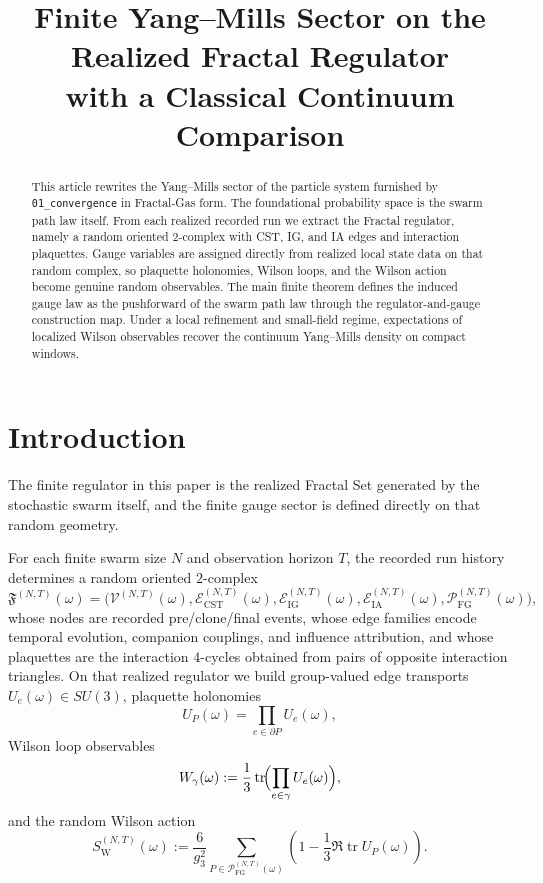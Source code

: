 \documentclass[11pt]{article}
\title{Finite Yang--Mills Sector on the Realized Fractal Regulator\\
with a Classical Continuum Comparison}
\author{}
\date{}
\theoremstyle{definition}
\theoremstyle{remark}
\newcommand{\mcE}{\mathcal E}
\newcommand{\mcP}{\mathcal P}
\newcommand{\mcV}{\mathcal V}
\newcommand{\tr}{\operatorname{tr}}
\begin{document}
\maketitle

\begin{abstract}
This article rewrites the Yang--Mills sector of the particle system furnished
by \texttt{01\_convergence} in Fractal-Gas form. The foundational probability
space is the swarm path law itself. From each realized recorded run we extract
the Fractal regulator, namely a random oriented \(2\)-complex with CST, IG,
and IA edges and interaction plaquettes. Gauge variables are assigned directly
from realized local state data on that random complex, so plaquette holonomies,
Wilson loops, and the Wilson action become genuine random observables. The main
finite theorem defines the induced gauge law as the pushforward of the swarm
path law through the regulator-and-gauge construction map. Under a local
refinement and small-field regime, expectations of localized Wilson observables
recover the continuum Yang--Mills density on compact windows.
\end{abstract}

\tableofcontents

\section{Introduction}

The finite regulator in this paper is the realized Fractal Set generated by the
stochastic swarm itself, and the finite gauge sector is defined directly on
that random geometry.

For each finite swarm size \(N\) and observation horizon \(T\), the recorded
run history determines a random oriented \(2\)-complex
\[
\mathfrak F^{(N,T)}(\omega)
=
\bigl(\mcV^{(N,T)}(\omega),\mcE_{\mathrm{CST}}^{(N,T)}(\omega),
\mcE_{\mathrm{IG}}^{(N,T)}(\omega),\mcE_{\mathrm{IA}}^{(N,T)}(\omega),
\mcP_{\mathrm{FG}}^{(N,T)}(\omega)\bigr),
\]
whose nodes are recorded pre/clone/final events, whose edge families encode
temporal evolution, companion couplings, and influence attribution, and whose
plaquettes are the interaction \(4\)-cycles obtained from pairs of opposite
interaction triangles. On that realized regulator we build group-valued edge
transports \(U_e(\omega)\in SU(3)\), plaquette holonomies
\[
U_P(\omega)=\prod_{e\in\partial P}U_e(\omega),
\]
Wilson loop observables
\[
W_\gamma(\omega):=\frac13\tr\!\Bigl(\prod_{e\in\gamma}U_e(\omega)\Bigr),
\]
and the random Wilson action
\[
S_{\mathrm W}^{(N,T)}(\omega)
:=
\frac{6}{g_3^2}\sum_{P\in\mcP_{\mathrm{FG}}^{(N,T)}(\omega)}
\left(1-\frac13\Re\tr U_P(\omega)\right).
\]
\end{document}
